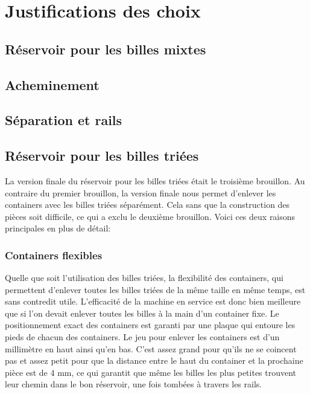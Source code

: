 \chapter{Justifications des choix}

\section{Réservoir pour les billes mixtes}

\section{Acheminement}

\section{Séparation et rails}

\section{Réservoir pour les billes triées}
La version finale du réservoir pour les billes triées était le troisième brouillon. Au contraire du premier brouillon, la version finale nous permet d'enlever les containers avec les billes triées séparément. Cela sans que la construction des pièces soit difficile, ce qui a exclu le deuxième brouillon. Voici ces deux raisons principales en plus de détail:

\subsection{Containers flexibles}
Quelle que soit l'utilisation des billes triées, la flexibilité des containers, qui permettent d'enlever toutes les billes triées de la même taille en même temps, est sans contredit utile. L'efficacité de la machine en service est donc bien meilleure que si l'on devait enlever toutes les billes à la main d'un container fixe. Le positionnement exact des containers est garanti par une plaque %
qui entoure les pieds de chacun des containers. Le jeu pour enlever les containers est d'un millimètre en haut ainsi qu'en bas. C'est assez grand pour qu'ils ne se coincent pas et assez petit pour que la distance entre le haut du container et la prochaine pièce est de 4 mm, ce qui garantit que même les billes les plus petites trouvent leur chemin dans le bon réservoir, une fois tombées à travers les rails.

